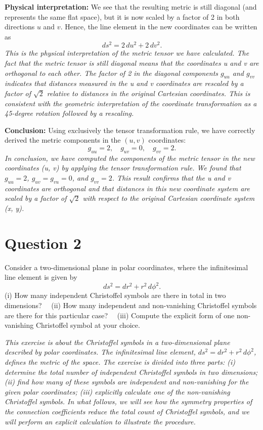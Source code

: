 \documentclass{article}
\begin{document}
\textbf{Physical interpretation:} We see that the resulting metric is still diagonal (and represents the same flat space), but it is now scaled by a factor of 2 in both directions \(u\) and \(v\). Hence, the line element in the new coordinates can be written as
\[
ds^2 = 2\,du^2 + 2\,dv^2.
\]
\emph{This is the physical interpretation of the metric tensor we have calculated. The fact that the metric tensor is still diagonal means that the coordinates u and v are orthogonal to each other. The factor of 2 in the diagonal components \(g_{uu}\) and \(g_{vv}\) indicates that distances measured in the u and v coordinates are rescaled by a factor of \(\sqrt{2}\) relative to distances in the original Cartesian coordinates. This is consistent with the geometric interpretation of the coordinate transformation as a 45-degree rotation followed by a rescaling.}

\textbf{Conclusion:}
Using exclusively the tensor transformation rule, we have correctly derived the metric components in the \((u, v)\) coordinates:
\[
g_{uu} = 2, 
\quad
g_{uv} = 0, 
\quad
g_{vv} = 2.
\]
\emph{In conclusion, we have computed the components of the metric tensor in the new coordinates (u, v) by applying the tensor transformation rule. We found that \(g_{uu} = 2\), \(g_{uv} = g_{vu} = 0\), and \(g_{vv} = 2\). This result confirms that the u and v coordinates are orthogonal and that distances in this new coordinate system are scaled by a factor of \(\sqrt{2}\) with respect to the original Cartesian coordinate system (x, y).}

\pagebreak

\section*{Question 2}

Consider a two-dimensional plane in polar coordinates, where the infinitesimal line element is given by 
\[
ds^2 = dr^2 + r^2\,d\phi^2.
\]
(i) How many independent Christoffel symbols are there in total in two dimensions?  
(ii) How many independent and non-vanishing Christoffel symbols are there for this particular case?  
(iii) Compute the explicit form of one non-vanishing Christoffel symbol at your choice.

\emph{This exercise is about the Christoffel symbols in a two-dimensional plane described by polar coordinates. The infinitesimal line element, \(ds^2 = dr^2 + r^2\,d\phi^2\), defines the metric of the space. The exercise is divided into three parts: (i) determine the total number of independent Christoffel symbols in two dimensions; (ii) find how many of these symbols are independent and non-vanishing for the given polar coordinates; (iii) explicitly calculate one of the non-vanishing Christoffel symbols. In what follows, we will see how the symmetry properties of the connection coefficients reduce the total count of Christoffel symbols, and we will perform an explicit calculation to illustrate the procedure.}
\end{document}
